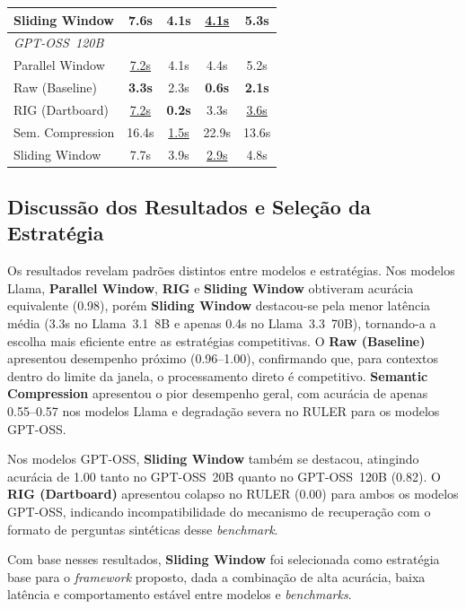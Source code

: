\begin{table}[htbp]
\begin{tabular}{lccc|c}
    Sliding Window     & 7.6s          & 4.1s             & \underline{4.1s} & 5.3s \\
    \midrule
    \multicolumn{5}{l}{\textit{GPT-OSS~120B}} \\
    Parallel Window    & \underline{7.2s} & 4.1s          & 4.4s          & 5.2s \\
    Raw (Baseline)     & \textbf{3.3s} & 2.3s             & \textbf{0.6s} & \textbf{2.1s} \\
    RIG (Dartboard)    & \underline{7.2s} & \textbf{0.2s} & 3.3s          & \underline{3.6s} \\
    Sem. Compression   & 16.4s         & \underline{1.5s} & 22.9s         & 13.6s \\
    Sliding Window     & 7.7s          & 3.9s             & \underline{2.9s} & 4.8s \\
    \bottomrule
    \end{tabular}
\end{table}

\subsection{Discussão dos Resultados e Seleção da Estratégia}

Os resultados revelam padrões distintos entre modelos e estratégias. Nos modelos Llama, \textbf{Parallel Window}, \textbf{RIG} e \textbf{Sliding Window} obtiveram acurácia equivalente (0.98), porém \textbf{Sliding Window} destacou-se pela menor latência média (3.3s no Llama~3.1~8B e apenas 0.4s no Llama~3.3~70B), tornando-a a escolha mais eficiente entre as estratégias competitivas. O \textbf{Raw (Baseline)} apresentou desempenho próximo (0.96--1.00), confirmando que, para contextos dentro do limite da janela, o processamento direto é competitivo. \textbf{Semantic Compression} apresentou o pior desempenho geral, com acurácia de apenas 0.55--0.57 nos modelos Llama e degradação severa no RULER para os modelos GPT-OSS.

Nos modelos GPT-OSS, \textbf{Sliding Window} também se destacou, atingindo acurácia de 1.00 tanto no GPT-OSS~20B quanto no GPT-OSS~120B (0.82). O \textbf{RIG (Dartboard)} apresentou colapso no RULER (0.00) para ambos os modelos GPT-OSS, indicando incompatibilidade do mecanismo de recuperação com o formato de perguntas sintéticas desse \textit{benchmark}.

Com base nesses resultados, \textbf{Sliding Window} foi selecionada como estratégia base para o \textit{framework} proposto, dada a combinação de alta acurácia, baixa latência e comportamento estável entre modelos e \textit{benchmarks}.

